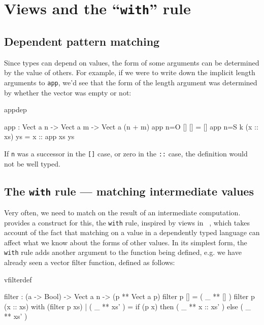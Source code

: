 \section{Views and the ``\texttt{with}'' rule}

\subsection{Dependent pattern matching}

Since types can depend on values, the form of some arguments can be determined
by the value of others. For example, if we were to write down the implicit
length arguments to \texttt{app}, we'd see that the form of the length argument was
determined by whether the vector was empty or not:

\begin{SaveVerbatim}{appdep}

app : Vect a n -> Vect a m -> Vect a (n + m)
app {n=O}   []        [] = []
app {n=S k} (x :: xs) ys = x :: app xs ys

\end{SaveVerbatim}

\noindent
If \texttt{n} was a successor in the \texttt{[]} case, or zero in the 
\texttt{::} case, the definition
would not be well typed.

\subsection{The \texttt{with} rule --- matching intermediate values}

Very often, we need to match on the result of an intermediate computation.
\Idris{} provides a construct for this, the \texttt{with} rule, 
inspired by views in \Epigram~\cite{view-left},
which takes account of the
fact that matching on a value in a dependently typed language can affect what
we know about the forms of other values. In its simplest form, the \texttt{with} rule
adds another argument to the function being defined, e.g. we have already seen
a vector filter function, defined as follows:

\begin{SaveVerbatim}{vfilterdef}

filter : (a -> Bool) -> Vect a n -> (p ** Vect a p)
filter p [] = ( _ ** [] )
filter p (x :: xs) with (filter p xs)
  | ( _ ** xs' ) 
     = if (p x) then ( _ ** x :: xs' ) else ( _ ** xs' )

\end{SaveVerbatim}

